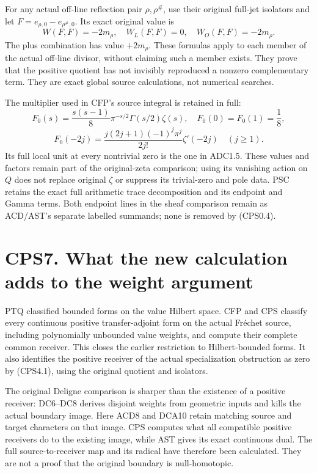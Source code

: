 For any actual off-line reflection pair \(\rho,\rho^\#\), use their
original full-jet isolators and let \(F=e_{\rho,0}-e_{\rho^\#,0}\). Its
exact original value is \[
W(F,F)=-2m_\rho,
\quad W_L(F,F)=0,
\quad W_O(F,F)=-2m_\rho.
\tag{CPS6.3}
\] The plus combination has value \(+2m_\rho\). These formulas apply to
each member of the actual off-line divisor, without claiming such a
member exists. They prove that the positive quotient has not invisibly
reproduced a nonzero complementary term. They are exact global source
calculations, not numerical searches.

The multiplier used in CFP's source integral is retained in full: \[
F_0(s)=\frac{s(s-1)}8\pi^{-s/2}\Gamma(s/2)\zeta(s),
\quad F_0(0)=F_0(1)=\frac18,
\tag{CPS6.4}
\] \[
F_0(-2j)=\frac{j(2j+1)(-1)^j\pi^j}{2j!}\zeta'(-2j)
\quad(j\ge1).
\tag{CPS6.5}
\] Its full local unit at every nontrivial zero is the one in ADC1.5.
These values and factors remain part of the original-zeta comparison;
using its vanishing action on \(Q\) does not replace original \(\zeta\)
or suppress its trivial-zero and pole data. PSC retains the exact full
arithmetic trace decomposition and its endpoint and Gamma terms. Both
endpoint lines in the sheaf comparison remain as ACD/AST's separate
labelled summands; none is removed by (CPS0.4).

\section{CPS7. What the new calculation adds to the weight
argument}\label{cps7.-what-the-new-calculation-adds-to-the-weight-argument}

PTQ classified bounded forms on the value Hilbert space. CFP and CPS
classify every continuous positive transfer-adjoint form on the actual
Fréchet source, including polynomially unbounded value weights, and
compute their complete common receiver. This closes the earlier
restriction to Hilbert-bounded forms. It also identifies the positive
receiver of the actual specialization obstruction as zero by (CPS4.1),
using the original quotient and isolators.

The original Deligne comparison is sharper than the existence of a
positive receiver: DC6--DC8 derives disjoint weights from geometric
inputs and kills the actual boundary image. Here ACD8 and DCA10 retain
matching source and target characters on that image. CPS computes what
all compatible positive receivers do to the existing image, while AST
gives its exact continuous dual. The full source-to-receiver map and its
radical have therefore been calculated. They are not a proof that the
original boundary is null-homotopic.

